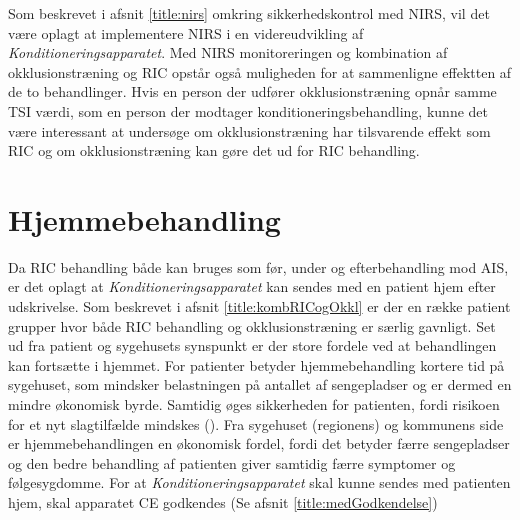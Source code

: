 Som beskrevet i afsnit \ref{title:nirs} omkring sikkerhedskontrol med NIRS, vil det være oplagt at implementere NIRS i en videreudvikling af \textit{Konditioneringsapparatet}. Med NIRS monitoreringen og kombination af okklusionstræning og RIC opstår også muligheden for at sammenligne effektten af de to behandlinger. Hvis en person der udfører okklusionstræning opnår samme TSI værdi, som en person der modtager konditioneringsbehandling, kunne det være interessant at undersøge om okklusionstræning har tilsvarende effekt som RIC og om okklusionstræning kan gøre det ud for RIC behandling. 

\section{Hjemmebehandling}\label{title:Hjemmebehandling}
Da RIC behandling både kan bruges som før, under og efterbehandling mod AIS, er det oplagt at \textit{Konditioneringsapparatet} kan sendes med en patient hjem efter udskrivelse. Som beskrevet i afsnit \ref{title:kombRICogOkkl} er der en række patient grupper hvor både RIC behandling og okklusionstræning er særlig gavnligt. Set ud fra patient og sygehusets synspunkt er der store fordele ved at behandlingen kan fortsætte i hjemmet. For patienter betyder hjemmebehandling kortere tid på sygehuset, som mindsker belastningen på antallet af sengepladser og er dermed en mindre økonomisk byrde. Samtidig øges sikkerheden for patienten, fordi risikoen for et nyt slagtilfælde mindskes (\cite{RefWorks:20}). Fra sygehuset (regionens) og kommunens side er hjemmebehandlingen en økonomisk fordel, fordi det betyder færre sengepladser og den bedre behandling af patienten giver samtidig færre symptomer og følgesygdomme. 
For at \textit{Konditioneringsapparatet} skal kunne sendes med patienten hjem, skal apparatet CE godkendes (Se afsnit \ref{title:medGodkendelse})